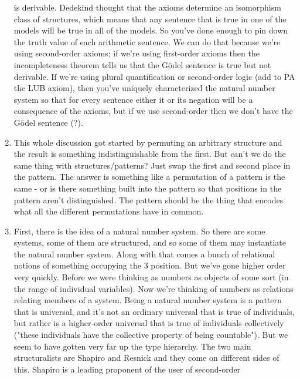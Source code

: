 \documentclass[12pt]{article}
\theoremstyle{definition}
\begin{document}
\begin{enumerate}
        is derivable. Dedekind thought that the axioms determine an isomorphism
        class of structures, which means that any sentence that is true in one
        of the models will be true in all of the models. So you've done enough
        to pin down the truth value of each arithmetic sentence. We can do that
        because we're using second-order axioms; if we're using first-order
        axioms then the incompleteness theorem tells us that the G\"odel
        sentence is true but not derivable. If we're using plural
        quantification or second-order logic (add to PA the LUB axiom), then
        you've uniquely characterized the natural number system so that for
        every sentence either it or its negation will be a consequence of the
        axioms, but if we use second-order then we don't have the G\"odel
        sentence (?).
    \item
        This whole discussion got started by permuting an arbitrary structure
        and the result is something indistinguishable from the first. But can't
        we do the same thing with structures/patterns? Just swap the first and
        second place in the pattern. The answer is something like a permutation
        of a pattern is the same - or is there something built into the pattern
        so that positions in the pattern aren't distinguished. The pattern
        should be the thing that encodes what all the different permutations
        have in common. 
    \item
        First, there is the idea of a natural number system. So there are some
        systems, some of them are structured, and so some of them may
        instantiate the natural number system. Along with that comes a bunch of
        relational notions of something occupying the 3 position. But we've
        gone higher order very quickly. Before we were thinking as numbers as
        objects of some sort (in the range of individual variables). Now we're
        thinking of numbers as relations relating members of a system. Being a
        natural number system is a pattern that is universal, and it's not an
        ordinary universal that is true of individuals, but rather is a
        higher-order universal that is true of individuals collectively ("these
        individuals have the collective property of being countable"). But we
        seem to have gotten very far up the type hierarchy. The two main
        structuralists are Shapiro and Resnick and they come on different sides
        of this. Shapiro is a leading proponent of the user of second-order

\end{enumerate}
\end{document}
